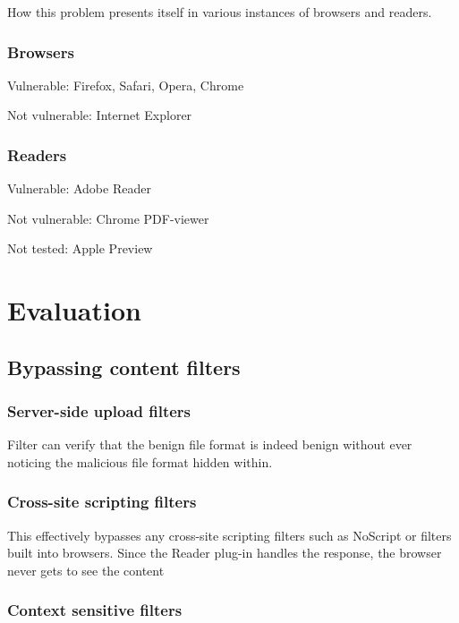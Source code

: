 \documentclass[10pt, conference, compsocconf]{IEEEtran}
\begin{document}
How this problem presents itself in various instances of browsers and readers.


\subsubsection{Browsers}

Vulnerable: Firefox, Safari, Opera, Chrome

Not vulnerable: Internet Explorer


\subsubsection{Readers}

Vulnerable: Adobe Reader

Not vulnerable: Chrome PDF-viewer

Not tested: Apple Preview









\section{Evaluation}


\subsection{Bypassing content filters}


\subsubsection{Server-side upload filters}

Filter can verify that the benign file format is indeed benign 
without ever noticing the malicious file format hidden within.


\subsubsection{Cross-site scripting filters}

This effectively bypasses any cross-site scripting filters such as 
NoScript or filters built into browsers. Since the Reader plug-in 
handles the response, the browser never gets to see the content


\subsubsection{Context sensitive filters}
\end{document}
